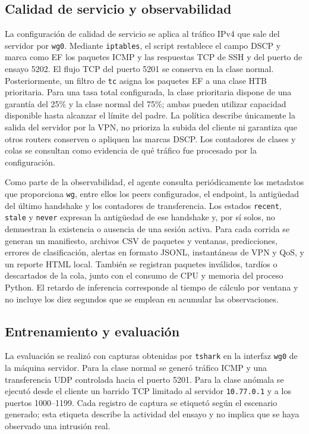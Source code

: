 \documentclass[conference]{IEEEtran}
\begin{document}
\subsection{Calidad de servicio y observabilidad}
La configuración de calidad de servicio se aplica al tráfico IPv4 que sale del servidor por \texttt{wg0}. Mediante \texttt{iptables}, el script restablece el campo DSCP y marca como EF los paquetes ICMP y las respuestas TCP de SSH y del puerto de ensayo 5202. El flujo TCP del puerto 5201 se conserva en la clase normal. Posteriormente, un filtro de \texttt{tc} asigna los paquetes EF a una clase HTB prioritaria. Para una tasa total configurada, la clase prioritaria dispone de una garantía del 25\% y la clase normal del 75\%; ambas pueden utilizar capacidad disponible hasta alcanzar el límite del padre. La política describe únicamente la salida del servidor por la VPN, no prioriza la subida del cliente ni garantiza que otros routers conserven o apliquen las marcas DSCP. Los contadores de clases y colas se consultan como evidencia de qué tráfico fue procesado por la configuración.

Como parte de la observabilidad, el agente consulta periódicamente los metadatos que proporciona \texttt{wg}, entre ellos los peers configurados, el endpoint, la antigüedad del último handshake y los contadores de transferencia. Los estados \texttt{recent}, \texttt{stale} y \texttt{never} expresan la antigüedad de ese handshake y, por sí solos, no demuestran la existencia o ausencia de una sesión activa. Para cada corrida se generan un manifiesto, archivos CSV de paquetes y ventanas, predicciones, errores de clasificación, alertas en formato JSONL, instantáneas de VPN y QoS, y un reporte HTML local. También se registran paquetes inválidos, tardíos o descartados de la cola, junto con el consumo de CPU y memoria del proceso Python. El retardo de inferencia corresponde al tiempo de cálculo por ventana y no incluye los diez segundos que se emplean en acumular las observaciones.

\subsection{Entrenamiento y evaluación}
La evaluación se realizó con capturas obtenidas por \texttt{tshark} en la interfaz \texttt{wg0} de la máquina servidor. Para la clase normal se generó tráfico ICMP y una transferencia UDP controlada hacia el puerto 5201. Para la clase anómala se ejecutó desde el cliente un barrido TCP limitado al servidor \texttt{10.77.0.1} y a los puertos 1000--1199. Cada registro de captura se etiquetó según el escenario generado; esta etiqueta describe la actividad del ensayo y no implica que se haya observado una intrusión real.
\end{document}

